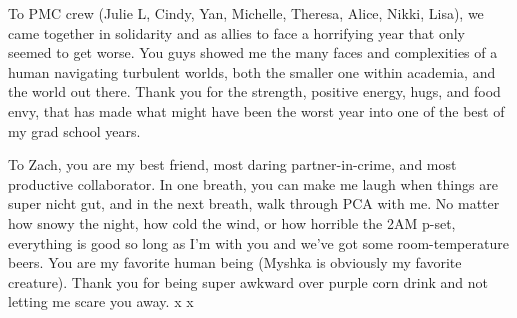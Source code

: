 To PMC crew (Julie L, Cindy, Yan, Michelle, Theresa, Alice, Nikki, Lisa),  we came together in solidarity and as allies to face a horrifying year that only seemed to get worse. You guys showed me the many faces and complexities of a human navigating turbulent worlds, both the smaller one within academia, and the world out there. Thank you for the strength, positive energy, hugs, and food envy, that has made what might have been the worst year into one of the best of my grad school years.

To Zach, you are my best friend, most daring partner-in-crime, and most productive collaborator. In one breath, you can make me laugh when things are super nicht gut, and in the next breath, walk through PCA with me. No matter how snowy the night, how cold the wind, or how horrible the 2AM p-set, everything is good so long as I'm with you and we've got some room-temperature beers. You are my favorite human being (Myshka is obviously my favorite creature). Thank you for being super awkward over purple corn drink and not letting me scare you away. x x


